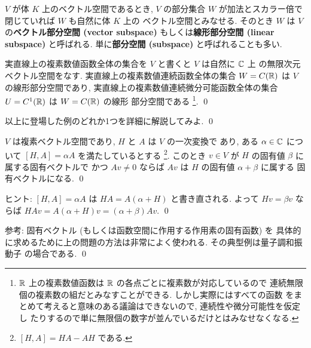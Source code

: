 \documentclass[12pt,twoside]{jarticle}
\begin{document}
\medskip

$V$ が体 $K$ 上のベクトル空間であるとき, 
$V$ の部分集合 $W$ が加法とスカラー倍で閉じていれば $W$ も自然に体 $K$ 上の
ベクトル空間とみなせる.  そのとき $W$ は $V$ の{\bf ベクトル部分空間 
(vector subspace)} もしくは{\bf 線形部分空間 (linear subspace)} と呼ばれる.
単に{\bf 部分空間 (subspace)} と呼ばれることも多い.


\begin{example}
  実直線上の複素数値函数全体の集合を $V$ と書くと $V$ は自然に ${\mathbb C}$ 上
  の無限次元ベクトル空間をなす.  
  実直線上の複素数値連続函数全体の集合 $W=C({\mathbb R})$ は $V$ の線形部分空間であり,
  実直線上の複素数値連続微分可能函数全体の集合 $U=C^1({\mathbb R})$ は $W=C({\mathbb R})$ の線形
  部分空間である%
  \footnote{${\mathbb R}$ 上の複素数値函数は ${\mathbb R}$ の各点ごとに複素数が対応しているので
    連続無限個の複素数の組だとみなすことができる.  しかし実際にはすべての函数
    をまとめて考えると意味のある議論はできないので, 連続性や微分可能性を仮定し
    たりするので単に無限個の数字が並んでいるだけとはみなせなくなる.}.
  \qed
\end{example}


\begin{question}
  以上に登場した例のどれか1つを詳細に解説してみよ. \qed
\end{question}


\begin{question}
  $V$ は複素ベクトル空間であり, $H$ と $A$ は $V$ の一次変換で
  あり, ある $\alpha\in{\mathbb C}$ について $[H,A]=\alpha A$ を満たしているとする%
  \footnote{$[H,A]=HA - AH$ である.}.
  このとき $v\in V$ が $H$ の固有値 $\beta$ に属する固有ベクトルで
  かつ $Av\ne 0$ ならば $Av$ は $H$ の固有値 $\alpha+\beta$ に属する
  固有ベクトルになる. \qed
\end{question}

\noindent
ヒント: $[H,A]=\alpha A$ は $HA = A(\alpha+H)$ と書き直される.
よって $Hv=\beta v$ ならば $HAv = A(\alpha+H)v = (\alpha+\beta)Av$.
\qed

\medskip
\noindent
参考: 固有ベクトル (もしくは函数空間に作用する作用素の固有函数) を
具体的に求めるために上の問題の方法は非常によく使われる.
その典型例は量子調和振動子%
の場合である.
\qed
\end{document}

